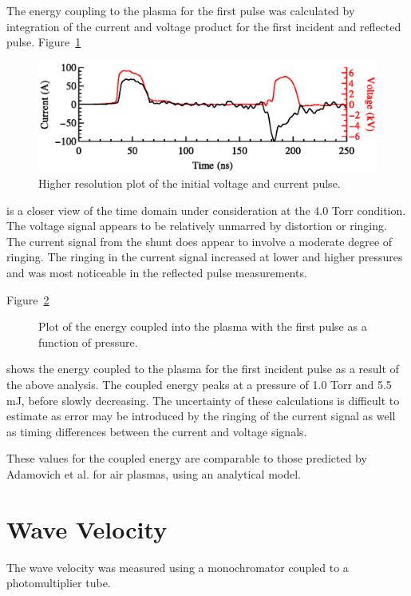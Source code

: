 The energy coupling to the plasma for the first pulse was calculated by
integration of the current and voltage product for the first incident and
reflected pulse. Figure~\ref{fig:energy}
\begin{figure}
  \centering
  \includegraphics{./chapters/experiment/figures/energy.eps}
  \caption{Higher resolution plot of the initial voltage and current pulse.}
  \label{fig:energy}
\end{figure}
is a closer view of the time domain under consideration at the 4.0 Torr
condition. The voltage signal appears to be relatively unmarred by distortion or
ringing. The current signal from the shunt does appear to involve a moderate
degree of ringing. The ringing in the current signal increased at lower and
higher pressures and was most noticeable in the reflected pulse measurements.

Figure~\ref{fig:energies}
\begin{figure}
  \centering
  \caption{Plot of the energy coupled into the plasma with the first pulse as
  a function of pressure.}
  \label{fig:energies}
\end{figure}
shows the energy coupled to the plasma for the first incident pulse as a result
of the above analysis. The coupled energy peaks at a pressure of 1.0 Torr and
5.5 mJ, before slowly decreasing. The uncertainty of these calculations is
difficult to estimate as error may be introduced by the ringing of the current
signal as well as timing differences between the current and voltage signals. 

These values for the coupled energy are comparable to those predicted by
Adamovich et al. \cite{Adamovich2009} for air plasmas, using an analytical
model. 

\section{Wave Velocity}

The wave velocity was measured using a monochromator coupled to
a photomultiplier tube.

